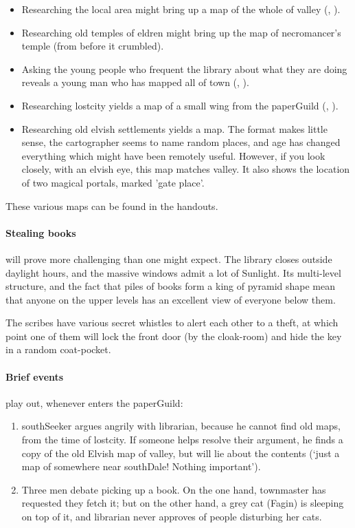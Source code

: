 \begin{multicols}{2}
\begin{itemize}
  \item
  Researching the local area might bring up a map of the whole of \gls{valley} (, \tn[14]).
  \item
  Researching old temples of \gls{eldren} might bring up the map of \gls{necromancer}'s temple (from before it crumbled).
  \item
  Asking the young people who frequent the library about what they are doing reveals a young man who has mapped all of \gls{town} (, \tn[10]).
  \item
  Researching \gls{lostcity} yields a map of a small wing from the \gls{paperGuild} (, \tn[18]).
  \item
  Researching old elvish settlements yields a map.
  The format makes little sense, the cartographer seems to name random places, and age has changed everything which might have been remotely useful.
  However, if you look closely, with an elvish eye, this map matches \gls{valley}.
  It also shows the location of two magical portals, marked 'gate place'.
\end{itemize}

These various maps can be found in the handouts.

\paragraph{Stealing books}
will prove more challenging than one might expect.
The library closes outside daylight hours, and the massive windows admit a lot of Sunlight.
Its multi-level structure, and the fact that piles of books form a king of pyramid shape mean that anyone on the upper levels has an excellent view of everyone below them.

The \glspl{scribe} have various secret whistles to alert each other to a theft, at which point one of them will lock the front door (by the cloak-room) and hide the key in a random coat-pocket.

\paragraph{Brief events}
play out, whenever  enters the \gls{paperGuild}:

\begin{enumerate}
  \item
  \Gls{southSeeker} argues angrily with \gls{librarian}, because he cannot find old maps, from the time of \gls{lostcity}.
  If someone helps resolve their argument, he finds a copy of the old Elvish map of \gls{valley}, but will lie about the contents (`just a map of somewhere near \gls{southDale}! Nothing important').
  \item
  Three men debate picking up a book.
  On the one hand, \gls{townmaster} has requested they fetch it; but on the other hand, a grey cat (Fagin) is sleeping on top of it, and \gls{librarian} never approves of people disturbing her cats.


\end{enumerate}
\end{multicols}
